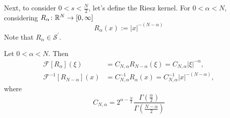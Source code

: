 \noindent Next, to consider $0 < s < \frac{N}{2}$, let's define the Riesz kernel. For $0 < \alpha < N$, considering $R_\alpha \colon \mathbb{R}^N \rightarrow [0,\infty]$
\begin{equation*}
	R_\alpha(x):=|x|^{-(N-\alpha)}
\end{equation*}
Note that $R_\alpha \in \mathcal{S}^\prime$.
\begin{prop}\label{prop:fouriesz}
	Let $0 < \alpha < N$. Then
	\begin{equation*}
		\begin{aligned}
			\mathcal{F}\left[R_\alpha\right](\xi)&=C_{N, \alpha} R_{N-\alpha}(\xi)=C_{N, \alpha}|\xi|^{-\alpha}, \\
			\mathcal{F}^{-1}\left[R_{N-\alpha}\right](x)&=C_{N, \alpha}^{-1} R_\alpha(x)=C_{N, \alpha}^{-1}|x|^{-(N-\alpha)},
		\end{aligned}
	\end{equation*}
	where
	\begin{equation*}
		C_{N, \alpha}=2^{\alpha-\frac{N}{2}} \frac{\Gamma\left(\frac{\alpha}{2}\right)}{\Gamma\left(\frac{N-\alpha}{2}\right)}
	\end{equation*}
\end{prop}
